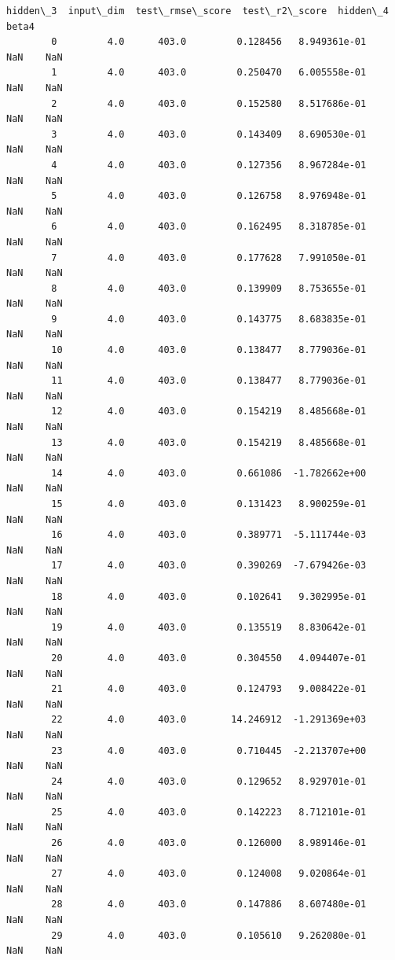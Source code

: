 \documentclass[11pt, a4paper , landscape]{article}
\begin{document}
\begin{Verbatim}[commandchars=\\\{\}]
             hidden\_3  input\_dim  test\_rmse\_score  test\_r2\_score  hidden\_4  beta4  
        0         4.0      403.0         0.128456   8.949361e-01       NaN    NaN  
        1         4.0      403.0         0.250470   6.005558e-01       NaN    NaN  
        2         4.0      403.0         0.152580   8.517686e-01       NaN    NaN  
        3         4.0      403.0         0.143409   8.690530e-01       NaN    NaN  
        4         4.0      403.0         0.127356   8.967284e-01       NaN    NaN  
        5         4.0      403.0         0.126758   8.976948e-01       NaN    NaN  
        6         4.0      403.0         0.162495   8.318785e-01       NaN    NaN  
        7         4.0      403.0         0.177628   7.991050e-01       NaN    NaN  
        8         4.0      403.0         0.139909   8.753655e-01       NaN    NaN  
        9         4.0      403.0         0.143775   8.683835e-01       NaN    NaN  
        10        4.0      403.0         0.138477   8.779036e-01       NaN    NaN  
        11        4.0      403.0         0.138477   8.779036e-01       NaN    NaN  
        12        4.0      403.0         0.154219   8.485668e-01       NaN    NaN  
        13        4.0      403.0         0.154219   8.485668e-01       NaN    NaN  
        14        4.0      403.0         0.661086  -1.782662e+00       NaN    NaN  
        15        4.0      403.0         0.131423   8.900259e-01       NaN    NaN  
        16        4.0      403.0         0.389771  -5.111744e-03       NaN    NaN  
        17        4.0      403.0         0.390269  -7.679426e-03       NaN    NaN  
        18        4.0      403.0         0.102641   9.302995e-01       NaN    NaN  
        19        4.0      403.0         0.135519   8.830642e-01       NaN    NaN  
        20        4.0      403.0         0.304550   4.094407e-01       NaN    NaN  
        21        4.0      403.0         0.124793   9.008422e-01       NaN    NaN  
        22        4.0      403.0        14.246912  -1.291369e+03       NaN    NaN  
        23        4.0      403.0         0.710445  -2.213707e+00       NaN    NaN  
        24        4.0      403.0         0.129652   8.929701e-01       NaN    NaN  
        25        4.0      403.0         0.142223   8.712101e-01       NaN    NaN  
        26        4.0      403.0         0.126000   8.989146e-01       NaN    NaN  
        27        4.0      403.0         0.124008   9.020864e-01       NaN    NaN  
        28        4.0      403.0         0.147886   8.607480e-01       NaN    NaN  
        29        4.0      403.0         0.105610   9.262080e-01       NaN    NaN  

\end{Verbatim}
\end{document}

